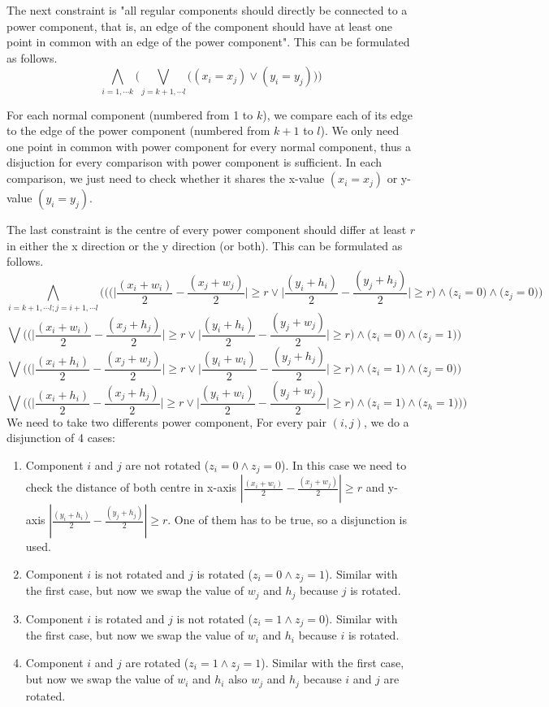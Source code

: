 \documentclass[12pt]{article}
\begin{document}
The next constraint is "all regular components should directly be connected to a power component, that is, an edge of the component should have at least one point in common with an edge of the power component". This can be formulated as follows.
\[ \bigwedge_{i=1, \cdots k} \Bigg({\bigvee_{j=k+1, \cdots l} \bigg({(x_i =x_j) \vee (y_i =y_j) \bigg)} \Bigg)}
\]

For each normal component (numbered from 1 to $k$), we compare each of its edge to the edge of the power component (numbered from $k+1$ to $l$). We only need one point in common with power component for every normal component, thus a disjuction for every comparison with power component is sufficient. In each comparison, we just need to check whether it shares the x-value $(x_i=x_j)$ or y-value $(y_i=y_j)$.

The last constraint is the centre of every power component should differ at least $r$ in either the x direction or the y direction (or both). This can be formulated as follows.
\[
\bigwedge_{i=k+1, \cdots l; j=i+1,\cdots l}{\Bigg( \bigg(\Big( \Big|\frac{(x_i+w_i)}{2} - \frac{(x_j+w_j)}{2}\Big| \geq r  \vee \Big|\frac{(y_i+h_i)}{2} - \frac{(y_j+h_j)}{2}\Big| \geq r \Big) \wedge \Big(z_i=0\Big) \wedge \Big(z_j=0\Big) \bigg) }\]
\[
{\bigvee \bigg(\Big( \Big|\frac{(x_i+w_i)}{2} - \frac{(x_j+h_j)}{2}\Big| \geq r  \vee \Big|\frac{(y_i+h_i)}{2} - \frac{(y_j+w_j)}{2}\Big| \geq r \Big) \wedge \Big(z_i=0\Big) \wedge \Big(z_j=1\Big)\bigg)}
\]
\[{\bigvee \bigg(\Big( \Big|\frac{(x_i+h_i)}{2} - \frac{(x_j+w_j)}{2}\Big| \geq r  \vee \Big|\frac{(y_i+w_i)}{2} - \frac{(y_j+h_j)}{2}\Big| \geq r \Big) \wedge \Big(z_i=1\Big) \wedge \Big(z_j=0\Big)\bigg)}\]
\[{\bigvee \bigg(\Big( \Big|\frac{(x_i+h_i)}{2} - \frac{(x_j+h_j)}{2}\Big| \geq r  \vee \Big|\frac{(y_i+w_i)}{2} - \frac{(y_j+w_j)}{2}\Big| \geq r \Big) \wedge \Big(z_i=1\Big) \wedge \Big(z_h=1\Big)\bigg)\Bigg)}\]
We need to take two differents power component, For every pair $(i,j)$, we do a disjunction of 4 cases: 
\begin{enumerate}
	\item Component $i$ and $j$ are not rotated ($z_i=0 \wedge z_j=0$). In this case we need to check the distance of both centre in x-axis $|\frac{(x_i+w_i)}{2} - \frac{(x_j+w_j)}{2}| \geq r $ and y-axis $|\frac{(y_i+h_i)}{2} - \frac{(y_j+h_j)}{2}| \geq r $. One of them has to be true, so a disjunction is used. 
	\item Component $i$ is not rotated and $j$ is rotated ($z_i=0 \wedge z_j=1$). Similar with the first case, but now we swap the value of $w_j$ and $h_j$ because $j$ is rotated.
	\item Component $i$ is rotated and $j$ is not rotated ($z_i=1 \wedge z_j=0$). Similar with the first case, but now we swap the value of $w_i$ and $h_i$ because $i$ is rotated.
	\item Component $i$ and $j$ are rotated ($z_i=1 \wedge z_j=1$). Similar with the first case, but now we swap the value of $w_i$ and $h_i$ also $w_j$ and $h_j$ because $i$ and $j$ are rotated.
\end{enumerate}
\end{document}

